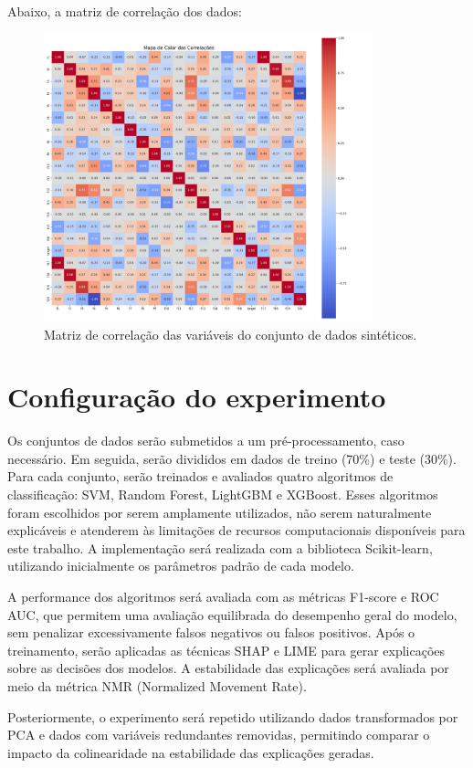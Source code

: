 Abaixo, a matriz de correlação dos dados:

\begin{figure}[H]
    \centering
    \includegraphics[width=0.85\textwidth]{figs/matriz_correlacao_dados_sinteticos.png}
    \caption{Matriz de correlação das variáveis do conjunto de dados sintéticos.}
    \label{fig:matriz_correlacao_dados_sinteticos}
\end{figure}


\section{Configuração do experimento}\label{sec:cofiguracao_experimentos}
Os conjuntos de dados serão submetidos a um pré-processamento, caso necessário. Em seguida, serão divididos em dados de treino (70\%) e teste (30\%). Para cada conjunto, serão treinados e avaliados quatro algoritmos de classificação: SVM, Random Forest, LightGBM e XGBoost. Esses algoritmos foram escolhidos por serem amplamente utilizados, não serem naturalmente explicáveis e atenderem às limitações de recursos computacionais disponíveis para este trabalho. A implementação será realizada com a biblioteca Scikit-learn, utilizando inicialmente os parâmetros padrão de cada modelo.

A performance dos algoritmos será avaliada com as métricas F1-score e ROC AUC, que permitem uma avaliação equilibrada do desempenho geral do modelo, sem penalizar excessivamente falsos negativos ou falsos positivos. Após o treinamento, serão aplicadas as técnicas SHAP e LIME para gerar explicações sobre as decisões dos modelos. A estabilidade das explicações será avaliada por meio da métrica NMR (Normalized Movement Rate).

Posteriormente, o experimento será repetido utilizando dados transformados por PCA e dados com variáveis redundantes removidas, permitindo comparar o impacto da colinearidade na estabilidade das explicações geradas.



